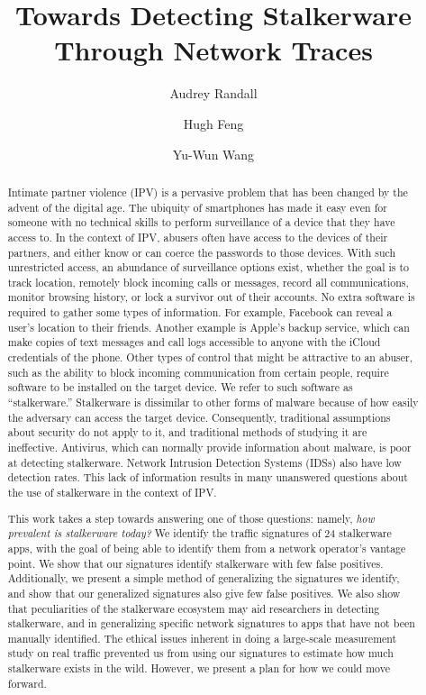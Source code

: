 \documentclass[acmtog]{acmart}
\begin{document}
\title{Towards Detecting Stalkerware Through Network Traces}


\author{Audrey Randall}
\author{Hugh Feng}
\author{Yu-Wun Wang}

\begin{abstract}
Intimate partner violence (IPV) is a pervasive problem that has been changed by 
the advent of the digital age. The ubiquity of smartphones has made it easy 
even for someone with no technical skills to perform surveillance of a device 
that they have access to. In the context of IPV, abusers often have access to 
the devices of their partners, and either know or can coerce the passwords to 
those devices. With such unrestricted access, an abundance of surveillance 
options exist, 
whether the goal is to track location, remotely block incoming calls or 
messages, record all communications, monitor browsing history, or lock a 
survivor out of their accounts. No extra software is required to gather some 
types of information. For example, Facebook can reveal a user's 
location to their friends. Another example is Apple's backup service, which can 
make copies of text messages and call logs accessible to anyone with the iCloud 
credentials of the phone. Other types of control that might be attractive to an 
abuser, such as the ability to block incoming communication from certain 
people, require software to be installed on the target device. We refer to such 
software as ``stalkerware.'' Stalkerware is dissimilar to other forms of 
malware because of how easily the adversary can access the target device. 
Consequently, traditional assumptions about security do not apply to it, and 
traditional methods of studying it are ineffective. Antivirus, which can 
normally provide information about malware, is poor at detecting 
stalkerware.\cite{chatterjee_spyware_2018} Network Intrusion Detection Systems 
(IDSs) also have low detection rates. This lack of information results in many 
unanswered questions about the use of stalkerware in the context of IPV.

This work takes a step towards answering one of those questions: namely, 
\textit{how prevalent is stalkerware today?} We identify the traffic signatures 
of 24 stalkerware apps, with the goal of being able to identify them from a 
network operator's vantage point. We show that our signatures identify 
stalkerware with few false positives. Additionally, we present a simple method 
of generalizing the signatures we identify, and show that our generalized 
signatures also give few false positives. We also show that peculiarities of 
the stalkerware ecosystem may aid researchers in detecting stalkerware, and in 
generalizing specific network signatures to apps that have not been manually 
identified. The ethical issues inherent in doing a large-scale 
measurement study on real traffic prevented us from using our signatures to 
estimate how much stalkerware exists in the wild. However, we present a plan 
for how we could move forward. 
\end{abstract}
\end{document}

